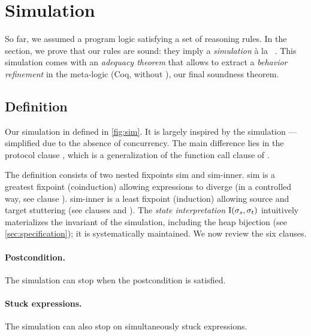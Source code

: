\section{Simulation}
\label{sec:simulation}



So far, we assumed a program logic satisfying a set of reasoning rules.
In the section, we prove that our rules are sound: they imply a \emph{simulation} à la \Simuliris~\citep*{simuliris-2022}.
This simulation comes with an \emph{adequacy theorem} that allows to extract a \emph{behavior refinement} in the meta-logic (Coq, without \Iris), our final soundness theorem.

\subsection{Definition}

Our simulation in defined in \cref{fig:sim}.
It is largely inspired by the \Simuliris simulation --- simplified due to the absence of concurrency.
The main difference lies in the protocol clause , which is a generalization of the function call clause of \Simuliris.

\newcommand{\iSimGfp}{\textcolor{\iSimGfpColor}{sim}\xspace}
\newcommand{\iSimLfp}{\textcolor{\iSimLfpColor}{sim-inner}\xspace}

The definition consists of two nested fixpoints \iSimGfp and \iSimLfp.
\iSimGfp is a greatest fixpoint (coinduction) allowing expressions to diverge (in a controlled way, see clause ).
\iSimLfp is a least fixpoint (induction) allowing source and target stuttering (see clauses  and ).
The \emph{state interpretation} $\mathrm{I} (\datalangState_s, \datalangState_t)$ intuitively materializes the invariant of the simulation, including the heap bijection (see \cref{sec:specification}); it is systematically maintained.
We now review the six clauses.

\paragraph{ Postcondition.}
The simulation can stop when the postcondition is satisfied.

\paragraph{ Stuck expressions.}
The simulation can also stop on simultaneously stuck expressions.

